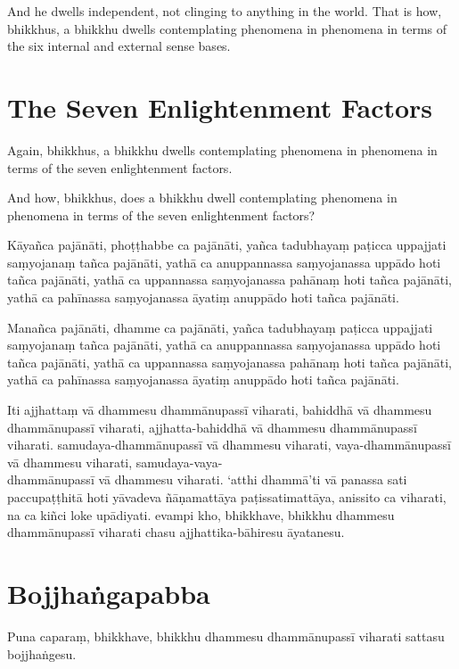 And he dwells independent, not clinging to anything in the world. That is how,
bhikkhus, a bhikkhu dwells contemplating phenomena in phenomena in terms of the
six internal and external sense bases.


\section{The Seven Enlightenment Factors}

Again, bhikkhus, a bhikkhu dwells contemplating phenomena in phenomena in terms
of the seven enlightenment factors.

And how, bhikkhus, does a bhikkhu dwell contemplating phenomena in phenomena in
terms of the seven enlightenment factors?

\paliPage

Kāyañca pajānāti,
phoṭṭhabbe ca pajānāti,
yañca tadubhayaṃ paṭicca uppajjati saṃyojanaṃ tañca pajānāti,
yathā ca anuppannassa saṃyojanassa uppādo hoti tañca pajānāti,
yathā ca uppannassa saṃyojanassa pahānaṃ hoti tañca pajānāti,
yathā ca pahīnassa saṃyojanassa āyatiṃ anuppādo hoti tañca pajānāti.

Manañca pajānāti,
dhamme ca pajānāti,
yañca tadubhayaṃ paṭicca uppajjati saṃyojanaṃ tañca pajānāti,
yathā ca anuppannassa saṃyojanassa uppādo hoti tañca pajānāti,
yathā ca uppannassa saṃyojanassa pahānaṃ hoti tañca pajānāti,
yathā ca pahīnassa saṃyojanassa āyatiṃ anuppādo hoti tañca pajānāti.

Iti ajjhattaṃ vā dhammesu dhammānupassī viharati,
bahiddhā vā dhammesu dhammānupassī viharati,
ajjhatta-bahiddhā vā dhammesu dhammānupassī viharati.
samudaya-dhammānupassī vā dhammesu viharati,
vaya-dhammānupassī vā dhammesu viharati,
samudaya-vaya-\\ dhammānupassī vā dhammesu viharati.
‘atthi dhammā’ti vā panassa sati paccupaṭṭhitā hoti
yāvadeva ñāṇamattāya paṭissatimattāya, anissito ca viharati,
na ca kiñci loke upādiyati. evampi kho, bhikkhave, bhikkhu
dhammesu dhammānupassī viharati chasu ajjhattika-bāhiresu āyatanesu.


\section*{Bojjhaṅgapabba}

Puna caparaṃ, bhikkhave, bhikkhu dhammesu dhammānupassī viharati sattasu
bojjhaṅgesu.


